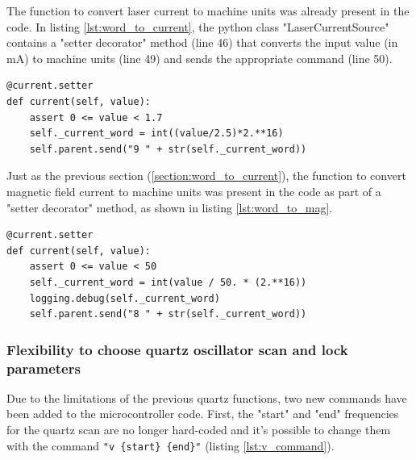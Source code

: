 \documentclass[a4paper,12pt]{article}
\newcounter{subsubsubsection}[subsubsection]
\begin{document}
\label{section:word_to_current}
The function to convert laser current to machine units was already present in the code. In listing \ref{lst:word_to_current}, the python class "LaserCurrentSource" contains a "setter decorator" method (line 46) that converts the input value (in mA) to machine units (line 49) and sends the appropriate command (line 50).

\begin{lstlisting}[style=python,label={lst:word_to_current},caption={Python function to convert laser current to machine units (file: mac\_device.py).},firstnumber=46]
@current.setter
def current(self, value):
    assert 0 <= value < 1.7
    self._current_word = int((value/2.5)*2.**16)
    self.parent.send("9 " + str(self._current_word))
\end{lstlisting}

Just as the previous section (\ref{section:word_to_current}), the function to convert magnetic field current to machine units was present in the code as part of a "setter decorator" method, as shown in listing \ref{lst:word_to_mag}.

\begin{lstlisting}[style=python,label={lst:word_to_mag},caption={Python function to convert magnetic field current to machine units (file: mac\_device.py).},firstnumber=62]
@current.setter
def current(self, value):
    assert 0 <= value < 50
    self._current_word = int(value / 50. * (2.**16))
    logging.debug(self._current_word)
    self.parent.send("8 " + str(self._current_word))
\end{lstlisting}


\subsubsection{Flexibility to choose quartz oscillator scan and lock parameters}
\label{section:scan_params}

Due to the limitations of the previous quartz functions, two new commands have been added to the microcontroller code. First, the "start" and "end" frequencies for the quartz scan are no longer hard-coded and it's possible to change them with the command \mbox{\texttt{"v \{start\} \{end\}"}} (listing \ref{lst:v_command}).
\end{document}
